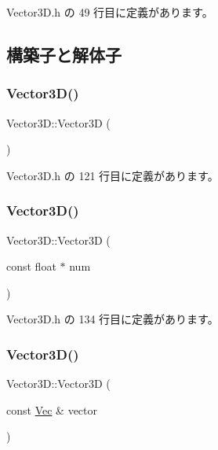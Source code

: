  Vector3\+D.\+h の 49 行目に定義があります。



\subsection{構築子と解体子}
\mbox{\label{class_vector3_d_a0b11a8d75da427b27443d8a94d0d296c}} 
\subsubsection{\texorpdfstring{Vector3\+D()}{Vector3D()}\hspace{0.1cm}{\footnotesize\ttfamily [1/5]}}
{\footnotesize\ttfamily Vector3\+D\+::\+Vector3D (\begin{DoxyParamCaption}{ }\end{DoxyParamCaption})\hspace{0.3cm}{\ttfamily [inline]}}



 Vector3\+D.\+h の 121 行目に定義があります。

\mbox{\label{class_vector3_d_a8021647d8191d446485dc153e49809b2}} 
\subsubsection{\texorpdfstring{Vector3\+D()}{Vector3D()}\hspace{0.1cm}{\footnotesize\ttfamily [2/5]}}
{\footnotesize\ttfamily Vector3\+D\+::\+Vector3D (\begin{DoxyParamCaption}\item[{const float $\ast$}]{num }\end{DoxyParamCaption})\hspace{0.3cm}{\ttfamily [inline]}}



 Vector3\+D.\+h の 134 行目に定義があります。

\mbox{\label{class_vector3_d_a446893e1b89f6e60ea16cf30ef0a3afc}} 
\subsubsection{\texorpdfstring{Vector3\+D()}{Vector3D()}\hspace{0.1cm}{\footnotesize\ttfamily [3/5]}}
{\footnotesize\ttfamily Vector3\+D\+::\+Vector3D (\begin{DoxyParamCaption}\item[{const \mbox{\hyperlink{_vector3_d_8h_a1f0b707f0d418d6cc74484019e41e55d}{Vec}} \&}]{vector }\end{DoxyParamCaption})\hspace{0.3cm}{\ttfamily [inline]}}



